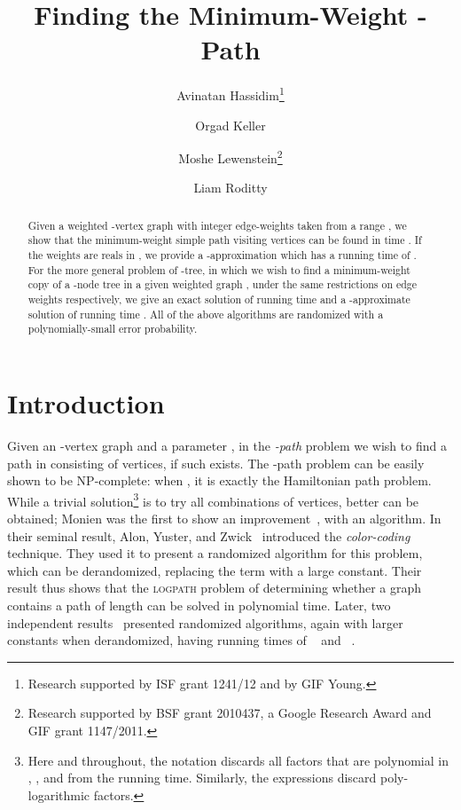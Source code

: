 \documentclass{llncs}
\begin{document}
\title{Finding the Minimum-Weight -Path}



\author{Avinatan Hassidim\thanks{Research supported by ISF grant 1241/12 and by GIF Young.} \and Orgad Keller \and Moshe Lewenstein\thanks{Research supported by BSF grant 2010437, a Google Research Award and GIF grant 1147/2011.} \and Liam Roditty}



\maketitle

\begin{abstract}
Given a weighted -vertex graph  with integer edge-weights taken from a range , we show that the minimum-weight simple path visiting  vertices can be found in time . If the weights are reals in , we provide a -approximation which has a running time of . For the more general problem of -tree, in which we wish to find a minimum-weight copy of a -node tree  in a given weighted graph , under the same restrictions on edge weights respectively, we give an exact solution of running time  and a -approximate solution of running time . All of the above algorithms are randomized with a polynomially-small error probability.
\end{abstract}



\section{Introduction}
Given an -vertex graph  and a parameter , in the \emph{-path} problem we wish to find a path in  consisting of  vertices, if such exists. 
The -path problem can be easily shown to be NP-complete: when , it is exactly the Hamiltonian path problem. While a trivial  solution\footnote{Here and throughout, the  notation discards all factors that are polynomial in , , and  from the running time. Similarly, the  expressions discard poly-logarithmic factors. 
} is to try all  combinations of  vertices, better can be obtained; Monien was the first to show an improvement~\cite{Monien85}, with an  algorithm. In their seminal result, Alon, Yuster, and Zwick~\cite{AYZ95}  introduced the \emph{color-coding} technique. They used it to present a randomized  algorithm for this problem, which can be derandomized, replacing the  term with a large constant. Their result thus shows that the \textsc{logpath} problem of determining whether a graph contains a path of length  can be solved in polynomial time.
Later, two independent results~\cite{KMRR06,CLSZ07} presented randomized  algorithms, again with larger constants when derandomized, having running times of ~\cite{KMRR06} and ~\cite{CLSZ07}.
\end{document}
